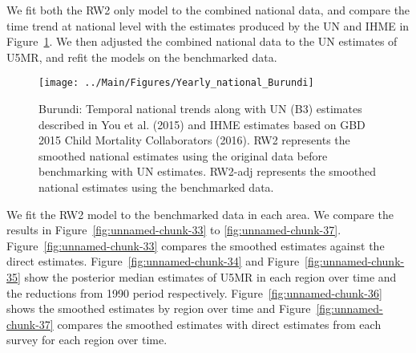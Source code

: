 \documentclass[12pt]{article}\usepackage[]{graphicx}\usepackage[]{color}
\newenvironment{knitrout}{}{} %
\begin{document}
We fit both the RW2 only model to the combined national data, and compare the time trend at national level with the estimates produced by the UN and IHME in Figure~\ref{fig:unnamed-chunk-32}. We then adjusted the combined national data to the UN estimates of U5MR, and refit the models on the benchmarked data. 

\begin{knitrout}
\color{fgcolor}\begin{figure}[bht]

{\centering \texttt{[image: ../Main/Figures/Yearly\_national\_Burundi]} 

}

\caption[Burundi]{Burundi: Temporal national trends along with UN (B3) estimates described in You et al. (2015) and IHME estimates based on GBD 2015 Child Mortality Collaborators (2016). RW2 represents the smoothed national estimates using the original data before benchmarking with UN estimates. RW2-adj represents the smoothed national estimates using the benchmarked data.}\label{fig:unnamed-chunk-32}
\end{figure}


\end{knitrout}
 

We fit the RW2 model to the benchmarked data in each area. 
We compare the results in Figure~\ref{fig:unnamed-chunk-33} to \ref{fig:unnamed-chunk-37}.
Figure~\ref{fig:unnamed-chunk-33} compares the smoothed estimates against the direct estimates. Figure~\ref{fig:unnamed-chunk-34} and Figure~\ref{fig:unnamed-chunk-35} show the posterior median estimates of U5MR in each region over time and the reductions from 1990 period respectively.
Figure~\ref{fig:unnamed-chunk-36} shows the smoothed estimates by region over time and Figure~\ref{fig:unnamed-chunk-37} compares the smoothed estimates with direct estimates from each survey for each region over time.




\end{document}
